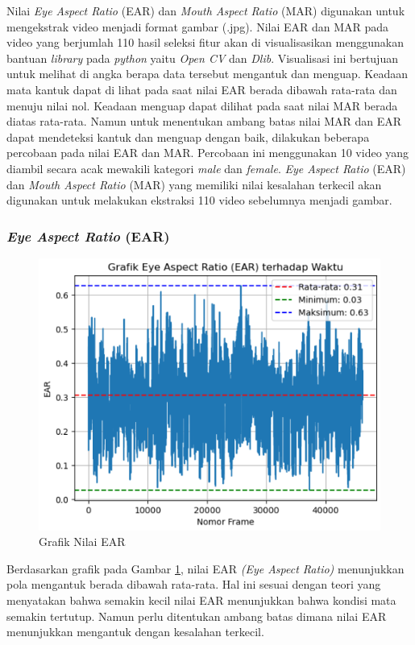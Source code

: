 \begin{table}[H]
    
    Nilai \textit{Eye Aspect Ratio} (EAR) dan \textit{Mouth Aspect Ratio} (MAR) digunakan untuk mengekstrak video menjadi format gambar (.jpg). Nilai EAR dan MAR pada video yang berjumlah 110 hasil seleksi fitur akan di visualisasikan menggunakan bantuan \textit{library} pada \textit{python} yaitu \textit{Open CV} dan \textit{Dlib}. Visualisasi ini bertujuan untuk melihat di angka berapa data tersebut mengantuk dan menguap. Keadaan mata kantuk dapat di lihat pada saat nilai EAR berada dibawah rata-rata dan menuju nilai nol. Keadaan menguap dapat dilihat pada saat nilai MAR berada diatas rata-rata. Namun untuk menentukan ambang batas nilai MAR dan EAR dapat mendeteksi kantuk dan menguap dengan baik, dilakukan beberapa  percobaan pada nilai EAR dan MAR. Percobaan ini menggunakan 10 video yang diambil secara acak mewakili kategori \textit{male} dan \textit{female}.
    \textit{Eye Aspect Ratio} (EAR) dan \textit{Mouth Aspect Ratio} (MAR) yang memiliki nilai kesalahan terkecil akan digunakan untuk melakukan ekstraksi 110 video sebelumnya menjadi gambar.

\subsubsection{\textit{Eye Aspect Ratio} (EAR)}

        
         \begin{figure}[H]
             \centering
             \includegraphics[width=0.75\linewidth]{figures/bab4/nilai ear.png}
             \caption{Grafik Nilai EAR}
             \label{Grafik Nilai EAR}
         \end{figure}

            Berdasarkan grafik pada Gambar \ref{Grafik Nilai EAR}, nilai EAR \textit{(Eye Aspect Ratio)} menunjukkan pola mengantuk berada dibawah rata-rata. Hal ini sesuai dengan teori yang menyatakan bahwa semakin kecil nilai EAR menunjukkan bahwa kondisi mata semakin tertutup. Namun perlu ditentukan ambang batas dimana nilai EAR menunjukkan mengantuk dengan kesalahan terkecil.
            

\end{table}

